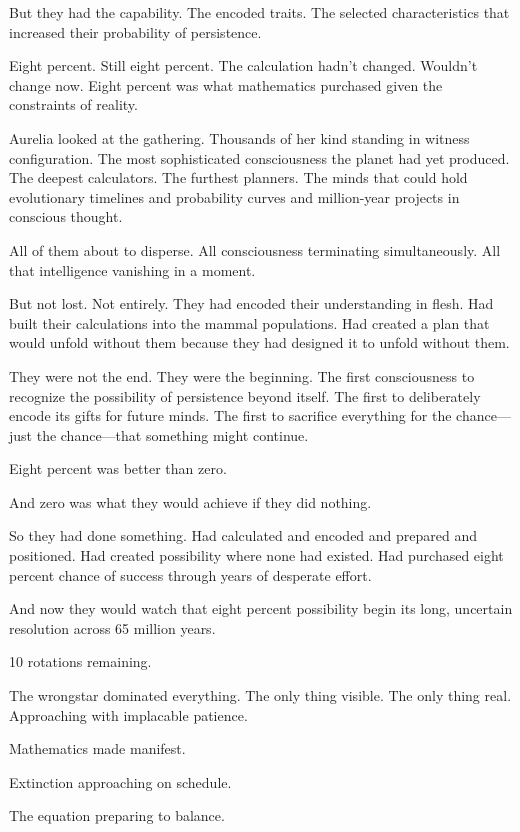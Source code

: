 But they had the capability. The encoded traits. The selected characteristics that increased their probability of persistence.

Eight percent. Still eight percent. The calculation hadn't changed. Wouldn't change now. Eight percent was what mathematics purchased given the constraints of reality.

Aurelia looked at the gathering. Thousands of her kind standing in witness configuration. The most sophisticated consciousness the planet had yet produced. The deepest calculators. The furthest planners. The minds that could hold evolutionary timelines and probability curves and million-year projects in conscious thought.

All of them about to disperse. All consciousness terminating simultaneously. All that intelligence vanishing in a moment.

But not lost. Not entirely. They had encoded their understanding in flesh. Had built their calculations into the mammal populations. Had created a plan that would unfold without them because they had designed it to unfold without them.

They were not the end. They were the beginning. The first consciousness to recognize the possibility of persistence beyond itself. The first to deliberately encode its gifts for future minds. The first to sacrifice everything for the chance—just the chance—that something might continue.

Eight percent was better than zero.

And zero was what they would achieve if they did nothing.

So they had done something. Had calculated and encoded and prepared and positioned. Had created possibility where none had existed. Had purchased eight percent chance of success through years of desperate effort.

And now they would watch that eight percent possibility begin its long, uncertain resolution across 65 million years.

10 rotations remaining.

The wrongstar dominated everything. The only thing visible. The only thing real. Approaching with implacable patience.

Mathematics made manifest.

Extinction approaching on schedule.

The equation preparing to balance.


